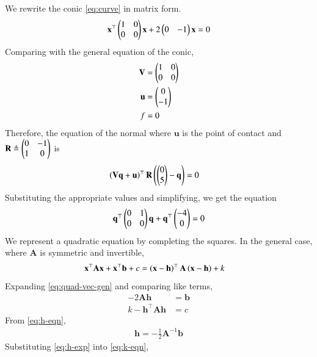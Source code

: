 \documentclass[journal,12pt,twocolumn]{IEEEtran}
\renewcommand{\vec}[1]{\boldsymbol{\mathbf{#1}}}
\begin{document}
\begin{enumerate}
    \solution We rewrite the conic \eqref{eq:curve} in matrix form.
    \begin{align}
        \vec{x}^\top\myvec{1&0\\0&0}\vec{x} + 2\myvec{0&-1}\vec{x} = 0
        \label{eq:curve-mtx}
    \end{align}
    Comparing with the general equation of the conic,
    \begin{align}
        \vec{V} &= \myvec{1&0\\0&0} \label{eq:V-val} \\
        \vec{u} &= \myvec{0\\-1} \label{eq:u-val} \\
        f &= 0 \label{eq:f-val}
    \end{align}
    Therefore, the equation of the normal where $\vec{u}$ is the point of contact 
    and $\vec{R} \triangleq \myvec{0&-1\\1&0}$ is
    \begin{align}
        \brak{\vec{Vq}+\vec{u}}^\top\vec{R}\brak{\myvec{0\\5}-\vec{q}} &= 0
        \label{eq:normal}
    \end{align}
    Substituting the appropriate values and simplifying, we get the equation
    \begin{align}
        \vec{q}^\top\myvec{0&1\\0&0}\vec{q} + \vec{q}^\top\myvec{-4\\0} = 0
        \label{eq:q-eqn}
    \end{align}
    We represent a quadratic equation by completing the squares. In the general
    case, where $\vec{A}$ is symmetric and invertible,
    \begin{align}
        \vec{x}^\top\vec{Ax} + \vec{x}^\top\vec{b} + c &= \brak{\vec{x}-\vec{h}}^\top\vec{A}\brak{\vec{x}-\vec{h}} + k
        \label{eq:quad-vec-gen}
    \end{align}
    Expanding \eqref{eq:quad-vec-gen} and comparing like terms,
    \begin{align}
        -2\vec{Ah} &= \vec{b} \label{eq:h-eqn} \\
        k - \vec{h}^\top\vec{Ah} &= c \label{eq:k-eqn}
    \end{align}
    From \eqref{eq:h-eqn},
    \begin{align}
        \vec{h} = -\frac{1}{2}\vec{A}^{-1}\vec{b}
        \label{eq:h-exp}
    \end{align}
    Substituting \eqref{eq:h-exp} into \eqref{eq:k-eqn},
    \begin{align}

\end{align}
\end{enumerate}
\end{document}
